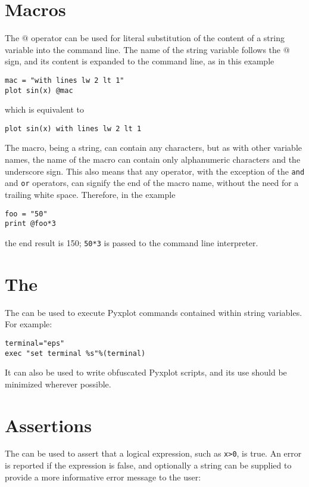 \section{Macros}

The $@$ operator can be used for literal substitution of the content of a
string variable into the command line.  The name of the string variable follows
the $@$ sign, and its content is expanded to the command line, as in this
example
\begin{verbatim}
mac = "with lines lw 2 lt 1"
plot sin(x) @mac
\end{verbatim}
which is equivalent to 
\begin{verbatim}
plot sin(x) with lines lw 2 lt 1
\end{verbatim}

The macro, being a string, can contain any characters, but as with other
variable names, the name of the macro can contain only alphanumeric characters
and the underscore sign. This also means that any operator, with the exception
of the {\tt and} and {\tt or} operators, can signify the end of the macro name,
without the need for a trailing white space. Therefore, in the example
\begin{verbatim}
foo = "50"
print @foo*3
\end{verbatim}
the end result is 150; {\tt 50*3} is passed to the command line interpreter.

\section{The }

The  can be used to execute Pyxplot commands contained within
string variables. For example:

\begin{verbatim}
terminal="eps"
exec "set terminal %s"%(terminal)
\end{verbatim}

\noindent It can also be used to write obfuscated Pyxplot scripts, and its use
should be minimized wherever possible.

\section{Assertions}

The  can be used to assert that a logical expression, such as
{\tt x>0}, is true. An error is reported if the expression is false, and
optionally a string can be supplied to provide a more informative error message
to the user:

